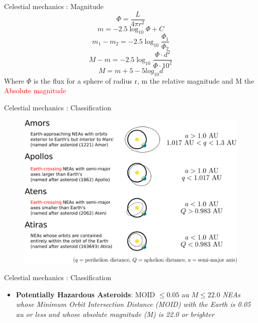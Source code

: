 \documentclass{beamer}
\begin{document}
\begin{frame}{Celestial mechanics \cite{murray1999solar}: Magnitude}
\begin{equation}
\Phi=\frac{L}{4\pi r^{2}}
\end{equation}
\begin{equation}
m=-2.5\log_{10}\Phi+C
\end{equation}
\begin{equation}
m_{1}-m_{2}=-2.5\log_{10}\frac{\Phi_{1}}{\Phi_{2}}
\end{equation}
\begin{equation}
M-m=-2.5\log_{10}\frac{\Phi\cdot d^{2} }{\Phi\cdot 10^{2}}
\end{equation}
\begin{equation}
M=m+5-5log_{10}d
\end{equation}
Where $\Phi$ is the flux for a sphere of radius r, m the relative magnitude and M the \textcolor{red}{Absolute magnitude}
\end{frame}

\begin{frame}{Celestial mechanics \cite{nasa_classification}: Classification}
\begin{figure}[h]
\begin{center}
\includegraphics[width=\textwidth]{Pic/neo_orbit_types.jpg}
\caption{\cite{nasa_classification}}
\label{Area_dynamics}
\end{center}
\end{figure}
\end{frame}

\begin{frame}{Celestial mechanics \cite{nasa_classification}: Classification}
\begin{itemize}
\item \textbf{Potentially Hazardous Asteroids}: MOID $\leq 0.05$ au $M \leq22.0$ \textit{NEAs whose Minimum Orbit Intersection Distance (MOID) with the Earth is 0.05 au or less and whose absolute magnitude (M) is 22.0 or brighter}
\end{itemize}
\end{frame}
\end{document}
